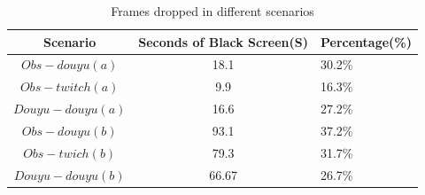 \begin{table}[tb]
\centering
\caption{Frames dropped in different scenarios}
\label{tbl:drop}
{\setlength{\tabcolsep}{1pt}
\begin{tabular}{|c|c|l|}
\hline
\textbf{Scenario} & \textbf{Seconds of Black Screen(S)} & \textbf{Percentage(\%)}   \\ \hline
$Obs-douyu(a)$               & 18.1         & 30.2\%                           \\ \hline
$Obs-twitch(a)$              & 9.9        & 16.3\%                            \\ \hline
$Douyu-douyu(a)$             & 16.6      & 27.2\% \\ \hline
$Obs-douyu(b)$            & 93.1      & 37.2\%     \\ \hline
$Obs-twich(b)$             & 79.3      & 31.7\%  \\ \hline
$Douyu-douyu(b)$              & 66.67         & 26.7\%  \\ \hline
\end{tabular}}
\end{table}